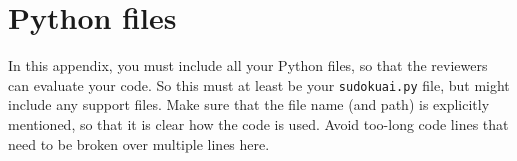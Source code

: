 \documentclass[11pt]{article}
\begin{document}


\clearpage
\appendix

\section*{Python files}
In this appendix, you must include all your Python files, so that the reviewers can evaluate your code.
So this must at least be your \texttt{sudokuai.py} file, but might include any support files.
Make sure that the file name (and path) is explicitly mentioned, so that it is clear how the code is used.
Avoid too-long code lines that need to be broken over multiple lines here.






\end{document}

